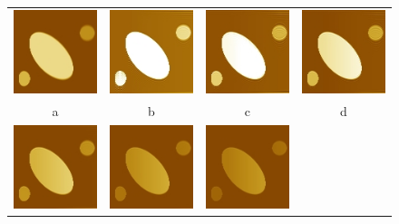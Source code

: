 \documentclass{procDDs}
\begin{document}
\begin{figure}[h!]\center%
	\label{ris:desc2}
	\begin{tabular}{cccc}
		\includegraphics[width=0.2\linewidth]{k-img-6-1.jpg}&
		\includegraphics[width=0.2\linewidth]{k-img-6-3.jpg}&
		\includegraphics[width=0.2\linewidth]{k-img-6-4.jpg}&
		\includegraphics[width=0.2\linewidth]{k-img-6-5.jpg}\\
		a & b & c & d \\
		\includegraphics[width=0.2\linewidth]{k-img-6-6.jpg}&
		\includegraphics[width=0.2\linewidth]{k-img-6-7.jpg}&
		\includegraphics[width=0.2\linewidth]{k-img-6-8.jpg}&

\end{tabular}
\end{figure}
\end{document}
